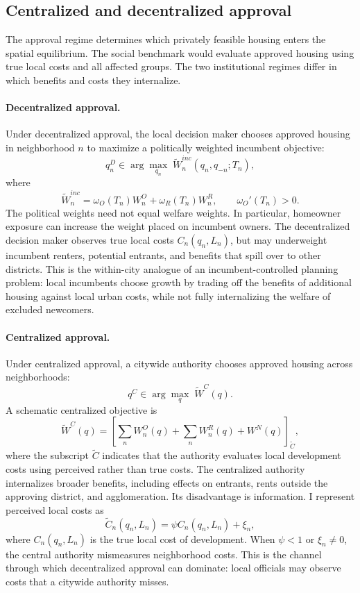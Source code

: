 \subsection{Centralized and decentralized approval}

The approval regime determines which privately feasible housing enters the spatial equilibrium.
The social benchmark would evaluate approved housing using true local costs and all affected groups.
The two institutional regimes differ in which benefits and costs they internalize.

\paragraph{Decentralized approval.}
Under decentralized approval, the local decision maker chooses approved housing in neighborhood \(n\) to maximize a politically weighted incumbent objective:
\[
    q_n^D
    \in
    \arg\max_{q_n}\;\widetilde W_n^{inc}(q_n,q_{-n};T_n),
\]
where
\[
    \widetilde W_n^{inc}
    =
    \omega_O(T_n)W_n^O+
    \omega_R(T_n)W_n^R,
    \qquad
    \omega_O'(T_n)>0.
\]
The political weights need not equal welfare weights.
In particular, homeowner exposure can increase the weight placed on incumbent owners.
The decentralized decision maker observes true local costs \(C_n(q_n,L_n)\), but may underweight incumbent renters, potential entrants, and benefits that spill over to other districts.
This is the within-city analogue of an incumbent-controlled planning problem: local incumbents choose growth by trading off the benefits of additional housing against local urban costs, while not fully internalizing the welfare of excluded newcomers.

\paragraph{Centralized approval.}
Under centralized approval, a citywide authority chooses approved housing across neighborhoods:
\[
    q^C
    \in
    \arg\max_q\;\widetilde W^C(q).
\]
A schematic centralized objective is
\[
    \widetilde W^C(q)
    =
    \left[\sum_n W_n^O(q)+\sum_n W_n^R(q)+W^N(q)\right]_{\widetilde C},
\]
where the subscript \(\widetilde C\) indicates that the authority evaluates local development costs using perceived rather than true costs.
The centralized authority internalizes broader benefits, including effects on entrants, rents outside the approving district, and agglomeration.
Its disadvantage is information.
I represent perceived local costs as
\[
    \widetilde C_n(q_n,L_n)
    =
    \psi C_n(q_n,L_n)+\xi_n,
\]
where \(C_n(q_n,L_n)\) is the true local cost of development.
When \(\psi<1\) or \(\xi_n\neq 0\), the central authority mismeasures neighborhood costs.
This is the channel through which decentralized approval can dominate: local officials may observe costs that a citywide authority misses.

